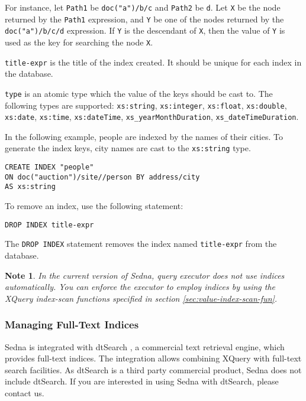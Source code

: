 \documentclass[a4paper,12pt]{article}
\newtheorem{note}{Note}    %
\begin{document}
For instance, let \verb!Path1! be \verb!doc("a")/b/c! and \verb!Path2! be
\verb!d!. Let \verb!X! be the node returned by the \verb!Path1! expression, and
\verb!Y! be one of the nodes returned by the \verb!doc("a")/b/c/d! expression.
If \verb!Y! is the descendant of \verb!X!, then the value of \verb!Y! is used as
the key for searching the node \verb!X!.

\verb!title-expr! is the title of the index created. It should be unique for
each index in the database.

\verb!type! is an atomic type which the value of the keys should be cast to. The
following types are supported: \verb!xs:string!, \verb!xs:integer!,
\verb!xs:float!, \verb!xs:double!, \verb!xs:date!, \verb!xs:time!,
\verb!xs:dateTime!, \verb!xs_yearMonthDuration!, \verb!xs_dateTimeDuration!.

In the following example, people are indexed by the names of their cities. To
generate the index keys, city names are cast to the \verb!xs:string! type.

\begin{verbatim}
CREATE INDEX "people"
ON doc("auction")/site//person BY address/city
AS xs:string
\end{verbatim}

To remove an index, use the following statement:
\begin{verbatim}
DROP INDEX title-expr
\end{verbatim}

The \verb!DROP INDEX! statement removes the index named \verb!title-expr! from
the database.

\begin{note} In the current version of Sedna, query executor does not use
indices automatically. You can enforce the executor to employ indices by using
the XQuery index-scan functions specified in section
\ref{sec:value-index-scan-fun}.
\end{note}


\subsubsection{Managing Full-Text Indices}
\label{sec:managing-ft-indices}
Sedna is integrated with dtSearch \cite{link:dtsearch-engine}, a commercial text
retrieval engine, which provides full-text indices. The integration allows
combining XQuery with full-text search facilities. As dtSearch is a third party
commercial product, Sedna does not include dtSearch. If you are interested in
using Sedna with dtSearch, please contact us.
\end{document}

